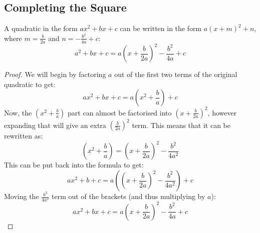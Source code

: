     \subsection{Completing the Square} \label{completing_the_square}
        \begin{theorem}
            A quadratic in the form $ax^2+bx+c$ can be written in the form $a(x+m)^2+n$, where $m=\frac{b}{2a}$ and $n=-\frac{b^2}{4a}+c$:
            \begin{equation}
                a^2+bx+c=a\left(x+\frac{b}{2a}\right)^2-\frac{b^2}{4a}+c
            \end{equation}
        \end{theorem}
        \begin{proof}
            We will begin by factoring $a$ out of the first two terms of the original quadratic to get:
            \begin{equation}
                ax^2+bx+c=a\left(x^2+\frac{b}{a}\right)+c
            \end{equation}
            Now, the $\left(x^2+\frac{b}{a}\right)$ part can almost be factorised into $\left(x+\frac{b}{2a}\right)^2$, however expanding that will give an extra $\left(\frac{b}{2a}\right)^2$ term.
            This means that it can be rewritten as:
            \begin{equation}
                \left(x^2+\frac{b}{a}\right)=\left(x+\frac{b}{2a}\right)^2-\frac{b^2}{4a^2}
            \end{equation}
            This can be put back into the formula to get:
            \begin{equation}
                ax^2+b+c=a\left(\left(x+\frac{b}{2a}\right)^2-\frac{b^2}{4a^2}\right)+c
            \end{equation}
            Moving the $\frac{b^2}{4a^2}$ term out of the brackets (and thus multiplying by $a$):
            \begin{equation}
                ax^2+bx+c=a\left(x+\frac{b}{2a}\right)^2-\frac{b^2}{4a}+c
            \end{equation}
        \end{proof}

